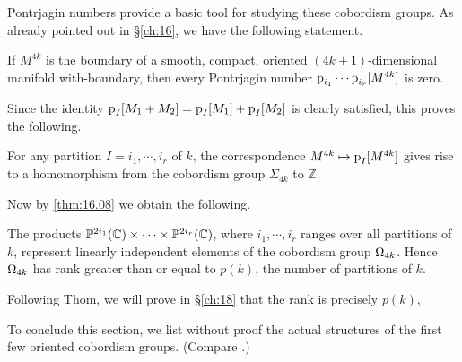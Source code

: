 \documentclass[../main]{subfiles}
\begin{document}
Pontrjagin numbers provide a basic tool for studying these cobordism groups. As already pointed out in \S\ref{ch:16}, we have the following statement.
\begin{lemma}[Pontrjagin]
\label{lem:17.03}
If $M^{4k}$ is the boundary of a smooth, compact, oriented $(4k+1)$-dimensional manifold with-boundary, then every Pontrjagin number $\operatorname{p}_{i_1} \cdots \operatorname{p}_{i_r}[M^{4k}]$ is zero.
\end{lemma}
Since the identity $\operatorname{p}_I[M_1 + M_2] = \operatorname{p}_I[M_1] + \operatorname{p}_I[M_2]$ is clearly satisfied, this proves the following.
\begin{corollary}
\label{cor:17.04}
For any partition $I = i_1,\cdots, i_r$ of $k$, the correspondence $M^{4k} \mapsto \operatorname{p}_I[M^{4k}]$ gives rise to a homomorphism from the cobordism group $\Sigma_{4k}$ to $\mathbb{Z}$.
\end{corollary}

Now by \ref{thm:16.08} we obtain the following.

\begin{corollary}
\label{cor:17.05}
The products $\mathbb{P}^{2i_1}(\mathbb C) \times \cdots \times \mathbb{P}^{2i_r}(\mathbb C)$, where $i_1,\cdots,i_r$ ranges over all partitions of $k$, represent linearly independent elements of the cobordism group $\Omega_{4k}$. Hence $\Omega_{4k}$ has rank greater than or equal to $p(k)$, the number of partitions of $k$.
\end{corollary}
Following Thom, we will prove in \S\ref{ch:18} that the rank is precisely $p(k)$,

To conclude this section, we list without proof the actual structures of the first few oriented cobordism groups. (Compare \cite[p. 309]{wall}.)
\allowdisplaybreaks
\end{document}
